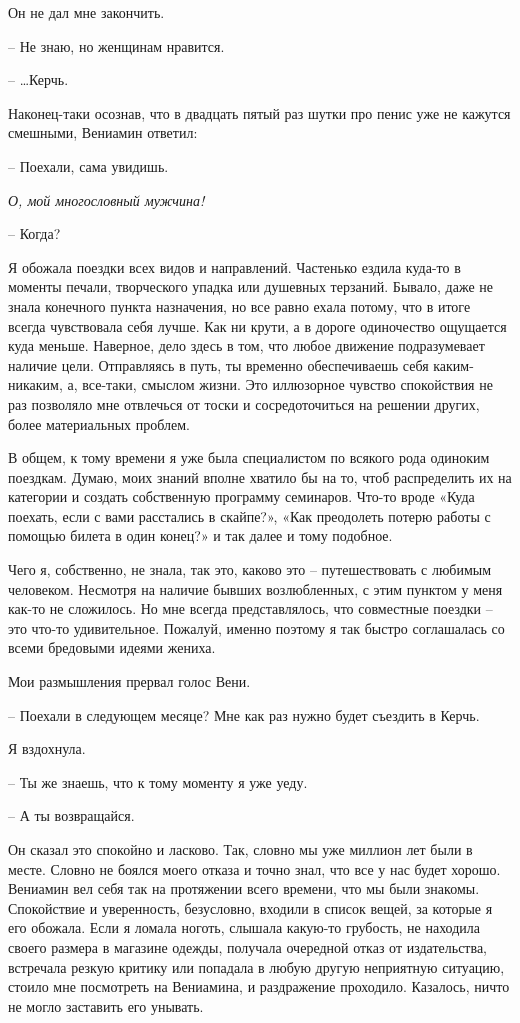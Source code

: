 \documentclass[
]{book}
\begin{document}
Он не дал мне закончить.

-- Не знаю, но женщинам нравится.

-- \ldots Керчь.

Наконец-таки осознав, что в двадцать пятый раз шутки про пенис уже не кажутся смешными, Вениамин ответил:

-- Поехали, сама увидишь.

\emph{О, мой многословный мужчина!}

-- Когда?

Я обожала поездки всех видов и направлений. Частенько ездила куда-то в моменты печали, творческого упадка или душевных терзаний. Бывало, даже не знала конечного пункта назначения, но все равно ехала потому, что в итоге всегда чувствовала себя лучше. Как ни крути, а в дороге одиночество ощущается куда меньше. Наверное, дело здесь в том, что любое движение подразумевает наличие цели. Отправляясь в путь, ты временно обеспечиваешь себя каким-никаким, а, все-таки, смыслом жизни. Это иллюзорное чувство спокойствия не раз позволяло мне отвлечься от тоски и сосредоточиться на решении других, более материальных проблем.

В общем, к тому времени я уже была специалистом по всякого рода одиноким поездкам. Думаю, моих знаний вполне хватило бы на то, чтоб распределить их на категории и создать собственную программу семинаров. Что-то вроде «Куда поехать, если с вами расстались в скайпе?», «Как преодолеть потерю работы с помощью билета в один конец?» и так далее и тому подобное.

Чего я, собственно, не знала, так это, каково это -- путешествовать с любимым человеком. Несмотря на наличие бывших возлюбленных, с этим пунктом у меня как-то не сложилось. Но мне всегда представлялось, что совместные поездки -- это что-то удивительное. Пожалуй, именно поэтому я так быстро соглашалась со всеми бредовыми идеями жениха.

Мои размышления прервал голос Вени.

-- Поехали в следующем месяце? Мне как раз нужно будет съездить в Керчь.

Я вздохнула.

-- Ты же знаешь, что к тому моменту я уже уеду.

-- А ты возвращайся.

Он сказал это спокойно и ласково. Так, словно мы уже миллион лет были в месте. Словно не боялся моего отказа и точно знал, что все у нас будет хорошо. Вениамин вел себя так на протяжении всего времени, что мы были знакомы. Спокойствие и уверенность, безусловно, входили в список вещей, за которые я его обожала. Если я ломала ноготь, слышала какую-то грубость, не находила своего размера в магазине одежды, получала очередной отказ от издательства, встречала резкую критику или попадала в любую другую неприятную ситуацию, стоило мне посмотреть на Вениамина, и раздражение проходило. Казалось, ничто не могло заставить его унывать.
\end{document}
